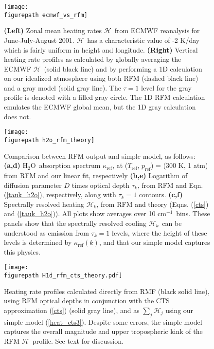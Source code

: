 \documentclass{ametsoc}
\newcommand{\eqnref}[1]{(\ref{#1})}
\newcommand{\cminverse}{\ensuremath{\mathrm{cm^{-1}}}}
\newcommand{\htwo}{\ensuremath{\mathrm{H_2O}}}
\newcommand{\ch}{\ensuremath{\mathcal{H}}}
\newcommand{\chk}{\ensuremath{\ch_k}}
\newcommand{\tauk}{\ensuremath{\tau_k}}
\newcommand{\kapparef}{\ensuremath{\kappa_{\mathrm{ref}}}}
\newcommand{\Tref}{\ensuremath{T_{\mathrm{ref}}}}
\newcommand{\pref}{\ensuremath{p_{\mathrm{ref}}}}
\newcommand{\figurepath}{../plots/}
\begin{document}
%
\begin{figure}[h]
	\begin{center}
			\texttt{[image: \\figurepath ecmwf\_vs\_rfm]}
			\caption{\textbf{(Left)}  Zonal mean heating rates \ch\ from ECMWF reanalysis for June-July-August 2001. \ch\ has a characteristic value of -2 K/day which is fairly uniform in height and longitude. 
						\textbf{(Right)} Vertical heating rate profiles as calculated by globally averaging the ECMWF \ch\ (solid black line) and by performing a 1D calculation on our idealized atmosphere using both RFM (dashed black line)  and  a gray model (solid gray line). The $\tau=1$ level for the gray profile is denoted with a filled gray circle. The 1D RFM calculation emulates the ECMWF global mean, but the 1D gray calculation does not.
			\label{ecmwf_vs_rfm}
			}
	 \end{center}
\end{figure}

\begin{figure}[h]
	\begin{center}
			\texttt{[image: \\figurepath h2o\_rfm\_theory]}
		\caption{Comparison between RFM output and simple model, as follows:
					 \textbf{(a,d)} \htwo\ absorption spectrum \kapparef, at (\Tref, \pref) = (300 K, 1 atm) from RFM and our linear fit, respectively
					 \textbf{(b,e)} Logarithm of diffusion parameter $D$ times optical depth $\tauk$, from RFM and Eqn. \eqnref{tauk_h2o}, respectively, along with $\tauk=1$ contours.
					 \textbf{(c,f)}  Spectrally resolved heating $\ch_k$, from RFM and theory (Eqns. \eqnref{cts} and \eqnref{tauk_h2o}). 
					 All plots show averages over 10 \cminverse\ bins. These panels show that the spectrally resolved cooling \chk\ can be understood as emission from $\tauk=1$ levels, where the height of these levels is determined by $\kapparef(k)$, and that  our simple model captures this physics.
		\label{h2o_rfm_theory}
		}
	\end{center}
\end{figure}


\begin{figure}[h!]
	\begin{center}
			\texttt{[image: \\figurepath H1d\_rfm\_cts\_theory.pdf]}
		\caption{ Heating rate profiles calculated directly from RMF (black solid line), using RFM optical depths in conjunction with the CTS approximation \eqnref{cts} (solid gray line), and as  $\sum_j\ch_j$ using our simple model \eqnref{heat_cts3}.  Despite some errors, the simple model captures  the overall magnitude and upper tropospheric kink of the RFM \ch\ profile. See text for discussion.
	  \label{H1d_rfm_cts_theory}
		}
	\end{center}
\end{figure}
\end{document}
